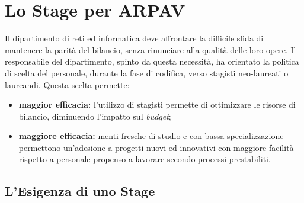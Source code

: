 \chapter{Lo Stage per ARPAV}
\label{2.0}
\thispagestyle{fancy} 

Il dipartimento di reti ed informatica deve affrontare la difficile sfida di mantenere la parità del bilancio, senza rinunciare alla qualità delle loro opere. Il responsabile del dipartimento, spinto da questa necessità, ha orientato la politica di scelta del personale, durante la fase di codifica, verso stagisti neo-laureati o laureandi. Questa scelta permette:

\begin{itemize}

	\item \textbf{maggior efficacia:} l'utilizzo di stagisti permette di ottimizzare le risorse di bilancio, diminuendo l'impatto sul \textit{budget};
	\item \textbf{maggiore efficacia:} menti fresche di studio e con bassa specializzazione permettono un'adesione a progetti nuovi ed innovativi con maggiore facilità rispetto a personale propenso a lavorare secondo processi prestabiliti.

\end{itemize}

\section{L'Esigenza di uno Stage}

